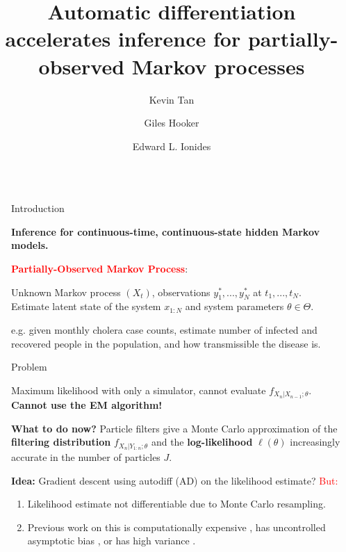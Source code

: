 \documentclass[final]{beamer}
\title{Automatic differentiation accelerates inference
for partially-observed Markov processes}
\author{Kevin Tan \inst{*} \and Giles Hooker \inst{*} \and Edward L. Ionides \inst{\cross[.4pt]$\cdot$}}
\institute[shortinst]{\inst{*} Department of Statistics and Data Science, University of Pennsylvania \quad  \inst{\cross[.4pt]} Department of Statistics, University of Michigan}
\newlength{\sepwidth}
\newlength{\colwidth}
\newcommand{\separatorcolumn}{\begin{column}{\sepwidth}\end{column}}
\begin{document}
\begin{frame}[t]
\begin{columns}[t]
\separatorcolumn

\begin{column}{\colwidth}

  \begin{block}{Introduction}
  
\textbf{Inference for continuous-time, continuous-state hidden Markov models.}

\begin{tcolorbox}[enhanced,colback=white!100!white,colframe=red!100!red]
\textbf{\textcolor{red}{Partially-Observed Markov Process}}: 

Unknown Markov process $(X_t)$, observations $y_1^*,...,y_N^*$ at $t_1,..., t_N$. \\
Estimate latent state of the system $x_{1:N}$ and system parameters $\theta \in \Theta$. 
\end{tcolorbox}
\small{e.g. given monthly cholera case counts, estimate number of infected and recovered people in the population, and how transmissible the disease is.}
  \end{block}


  \begin{block}{Problem}
  \vspace{-1.6ex}
  \begin{tcolorbox}[enhanced,colback=white!100!white,colframe=red!100!red]
  \begin{center}
  Maximum likelihood with only a simulator, cannot evaluate $f_{X_n|X_{n-1};\theta}$. \textbf{Cannot use the EM algorithm!}
  \end{center}
\end{tcolorbox}

  \textbf{What to do now?} Particle filters give a Monte Carlo approximation of the \textbf{filtering distribution} $f_{X_n|Y_{1:n};\theta}$ and the \textbf{log-likelihood} $\ell(\theta)$ increasingly accurate in the number of particles $J$. 
  
  \textbf{Idea:} Gradient descent using autodiff (AD) on the likelihood estimate? \textcolor{red}{But:}
  \vspace{-2.6ex}
  \begin{enumerate}
      \item Likelihood estimate not differentiable due to Monte Carlo resampling.
      \item Previous work \cite{corenflos21, naesseth18, poyiadjis11, scibior21} on this is computationally expensive \cite{corenflos21}, has uncontrolled asymptotic bias \cite{naesseth18}, or has high variance \cite{poyiadjis11, scibior21}. 
  \end{enumerate}
  \vspace{1ex}
  \end{block}
  

\end{column}
\end{columns}
\end{frame}
\end{document}
